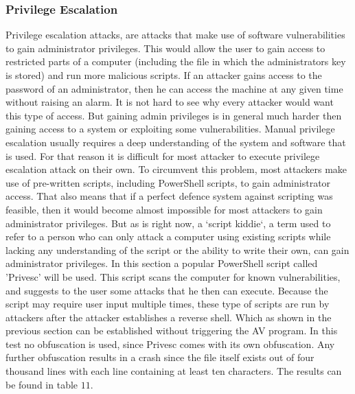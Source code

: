 \documentclass{article}%
\begin{document}
\subsubsection{Privilege Escalation}
Privilege escalation attacks, are attacks that make use of software vulnerabilities to gain administrator privileges. This would allow the user to gain access to restricted parts of a computer (including the file in which the administrators key is stored) and run more malicious scripts. If an attacker gains access to the password of an administrator, then he can access the machine at any given time without raising an alarm. It is not hard to see why every attacker would want this type of access. But gaining admin privileges is in general much harder then gaining access to a system or exploiting some vulnerabilities. Manual privilege escalation usually requires a deep understanding of the system and software that is used. For that reason it is difficult for most attacker to execute privilege escalation attack on their own. To circumvent this problem, most attackers make use of pre-written scripts, including PowerShell scripts, to gain administrator access. That also means that if a perfect defence system against scripting was feasible, then it would become almost impossible for most attackers to gain administrator privileges. But as is right now, a `script kiddie`, a term used to refer to a person who can only attack a computer using existing scripts while lacking any understanding of the script or the ability to write their own, can gain administrator privileges. In this section a popular PowerShell script called 'Privesc' will be used. This script scans the computer for known vulnerabilities, and suggests to the user some attacks that he then can execute. Because the script may require user input multiple times, these type of scripts are run by attackers after the attacker establishes a reverse shell. Which as shown in the previous section can be established without triggering the AV program. In this test no obfuscation is used, since Privesc comes with its own obfuscation. Any further obfuscation results in a crash since the file itself exists out of four thousand lines with each line containing at least ten characters. The results can be found in table $11$.
\end{document}
